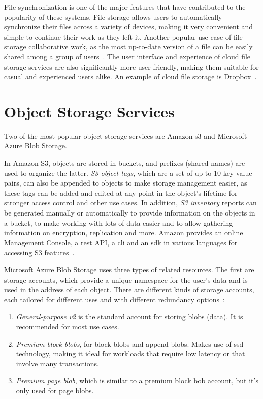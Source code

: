 File synchronization is one of the major features that have contributed to the popularity of these systems. File storage allows users to automatically synchronize their files across a variety of devices, making it very convenient and simple to continue their work as they left it. Another popular use case of file storage collaborative work, as the most up-to-date version of a file can be easily shared among a group of users~\cite{personal1}. The user interface and experience of cloud file storage services are also significantly more user-friendly, making them suitable for casual and experienced users alike. An example of cloud file storage is Dropbox~\cite{dropbox}.



\section{Object Storage Services}
Two of the most popular object storage services are Amazon \ac{s3} and Microsoft Azure Blob Storage.

In Amazon S3, objects are stored in buckets, and prefixes (shared names) are used to organize the latter. \textit{S3 object tags}, which are a set of up to 10 key-value pairs, can also be appended to objects to make storage management easier, as these tags can be added and edited at any point in the object's lifetime for stronger access control and other use cases. In addition, \textit{S3 inventory} reports can be generated manually or automatically to provide information on the objects in a bucket, to make working with lots of data easier and to allow gathering information on encryption, replication and more. Amazon provides an online Management Console, a \ac{rest} API, a \ac{cli} and an \ac{sdk} in various languages for accessing S3 features~\cite{s3faq}.

Microsoft Azure Blob Storage uses three types of related resources. The first are storage accounts, which provide a unique namespace for the user's data and is used in the address of each object. There are different kinds of storage accounts, each tailored for different uses and with different redundancy options~\cite{blobaccounts}:

\begin{enumerate}
    \item \textit{General-purpose v2} is the standard account for storing blobs (data). It is recommended for most use cases.

    \item \textit{Premium block blobs}, for block blobs and append blobs. Makes use of \ac{ssd} technology, making it ideal for workloads that require low latency or that involve many transactions.

    \item \textit{Premium page blob}, which is similar to a premium block bob account, but it's only used for page blobs.
\end{enumerate}


